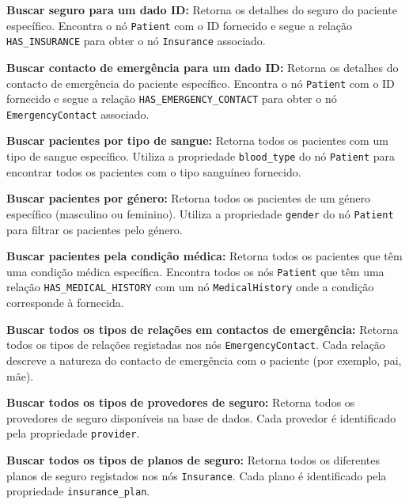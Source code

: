 \vspace{0.15cm} 
\textbf{Buscar seguro para um dado ID:} Retorna os detalhes do seguro do paciente específico. Encontra o nó \texttt{Patient} com o ID fornecido e segue a relação \texttt{HAS\_INSURANCE} para obter o nó \texttt{Insurance} associado.

\vspace{0.15cm} 
\textbf{Buscar contacto de emergência para um dado ID:} Retorna os detalhes do contacto de emergência do paciente específico. Encontra o nó \texttt{Patient} com o ID fornecido e segue a relação \texttt{HAS\_EMERGENCY\_CONTACT} para obter o nó \texttt{EmergencyContact} associado.

\vspace{0.15cm} 
\textbf{Buscar pacientes por tipo de sangue:} Retorna todos os pacientes com um tipo de sangue específico. Utiliza a propriedade \texttt{blood\_type} do nó \texttt{Patient} para encontrar todos os pacientes com o tipo sanguíneo fornecido.

\vspace{0.15cm} 
\textbf{Buscar pacientes por género:} Retorna todos os pacientes de um género específico (masculino ou feminino). Utiliza a propriedade \texttt{gender} do nó \texttt{Patient} para filtrar os pacientes pelo género.

\vspace{0.15cm} 
\textbf{Buscar pacientes pela condição médica:} Retorna todos os pacientes que têm uma condição médica específica. Encontra todos os nós \texttt{Patient} que têm uma relação \texttt{HAS\_MEDICAL\_HISTORY} com um nó \texttt{MedicalHistory} onde a condição corresponde à fornecida.

\vspace{0.15cm} 
\textbf{Buscar todos os tipos de relações em contactos de emergência:} Retorna todos os tipos de relações registadas nos nós \texttt{EmergencyContact}. Cada relação descreve a natureza do contacto de emergência com o paciente (por exemplo, pai, mãe).

\vspace{0.15cm} 
\textbf{Buscar todos os tipos de provedores de seguro:} Retorna todos os provedores de seguro disponíveis na base de dados. Cada provedor é identificado pela propriedade \texttt{provider}.

\vspace{0.15cm} 
\textbf{Buscar todos os tipos de planos de seguro:} Retorna todos os diferentes planos de seguro registados nos nós \texttt{Insurance}. Cada plano é identificado pela propriedade \texttt{insurance\_plan}.

